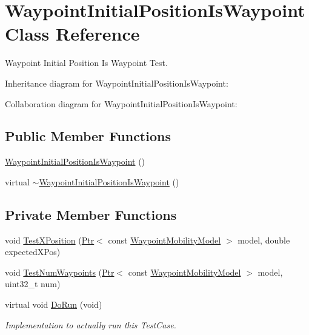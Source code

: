 \hypertarget{classWaypointInitialPositionIsWaypoint}{}\section{Waypoint\+Initial\+Position\+Is\+Waypoint Class Reference}
\label{classWaypointInitialPositionIsWaypoint}


Waypoint Initial Position Is Waypoint Test.  




Inheritance diagram for Waypoint\+Initial\+Position\+Is\+Waypoint\+:


Collaboration diagram for Waypoint\+Initial\+Position\+Is\+Waypoint\+:
\subsection*{Public Member Functions}
\begin{DoxyCompactItemize}
\item 
\hyperlink{classWaypointInitialPositionIsWaypoint_a4b872b5bcb0ce32b9caf0237dc093dd7}{Waypoint\+Initial\+Position\+Is\+Waypoint} ()
\item 
virtual \hyperlink{classWaypointInitialPositionIsWaypoint_a8e82207422979bdc9101338b12d9e466}{$\sim$\+Waypoint\+Initial\+Position\+Is\+Waypoint} ()
\end{DoxyCompactItemize}
\subsection*{Private Member Functions}
\begin{DoxyCompactItemize}
\item 
void \hyperlink{classWaypointInitialPositionIsWaypoint_aca01ac096251d1abe559ea98cad123e6}{Test\+X\+Position} (\hyperlink{classns3_1_1Ptr}{Ptr}$<$ const \hyperlink{classns3_1_1WaypointMobilityModel}{Waypoint\+Mobility\+Model} $>$ model, double expected\+X\+Pos)
\item 
void \hyperlink{classWaypointInitialPositionIsWaypoint_ac5c7ce5037e8704d07e7ed5cd1b8646f}{Test\+Num\+Waypoints} (\hyperlink{classns3_1_1Ptr}{Ptr}$<$ const \hyperlink{classns3_1_1WaypointMobilityModel}{Waypoint\+Mobility\+Model} $>$ model, uint32\+\_\+t num)
\item 
virtual void \hyperlink{classWaypointInitialPositionIsWaypoint_a277c97216e4f4c2c7cfffc2bace527e2}{Do\+Run} (void)
\begin{DoxyCompactList}\small\item\em Implementation to actually run this Test\+Case. \end{DoxyCompactList}\end{DoxyCompactItemize}
